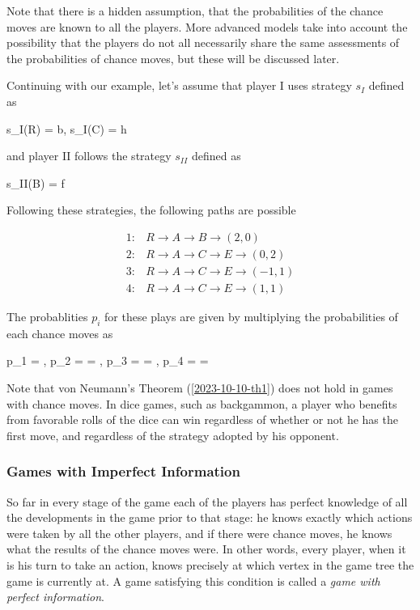 Note that there is a hidden assumption, that the probabilities of the chance moves are known to all the players. More advanced models take into account the possibility that the players do not all necessarily share the same assessments of the probabilities of chance moves, but these will be discussed later.

Continuing with our example, let's assume that player I uses strategy $s_I$ defined as

\bee
s_I(R) = b, s_I(C) = h
\eee

and player II follows the strategy $s_{II}$ defined as

\bee
s_{II}(B) = f
\eee

Following these strategies, the following paths are possible

\begin{align*}
1:& R \rightarrow A \rightarrow B \rightarrow (2,0) \\
2:& R \rightarrow A \rightarrow C \rightarrow E \rightarrow (0,2) \\
3:& R \rightarrow A \rightarrow C \rightarrow E \rightarrow (-1,1) \\
4:& R \rightarrow A \rightarrow C \rightarrow E \rightarrow (1,1)
\end{align*}

The probablities $p_i$ for these plays are given by multiplying the probabilities of each chance moves as

\bee
p_1 = , \quad p_2 =   = , \quad p_3 =   = , \quad p_4 =   = 
\eee

Note that von Neumann’s Theorem (\ref{2023-10-10-th1}) does not hold in games with chance moves. In dice games, such as backgammon, a player who benefits from favorable rolls of the dice can win regardless of whether or not he has the first move, and regardless of the strategy adopted by his opponent.

\subsubsection{Games with Imperfect Information}

So far in every stage of the game each of the players has perfect knowledge of all the developments in the game prior to that stage: he knows exactly which actions were taken by all the other players, and if there were chance moves, he knows what the results of the chance moves were. In other words, every player, when it is his turn to take an action, knows precisely at which
vertex in the game tree the game is currently at. A game satisfying this condition is called a \emph{game with perfect information}.

